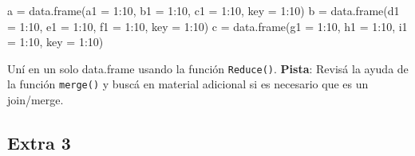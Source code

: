 \documentclass[
]{article}
\newenvironment{Shaded}{\begin{snugshade}}{\end{snugshade}}
\newcommand{\AttributeTok}[1]{\textcolor[rgb]{0.77,0.63,0.00}{#1}}
\newcommand{\DecValTok}[1]{\textcolor[rgb]{0.00,0.00,0.81}{#1}}
\newcommand{\FunctionTok}[1]{\textcolor[rgb]{0.00,0.00,0.00}{#1}}
\newcommand{\NormalTok}[1]{#1}
\newcommand{\OtherTok}[1]{\textcolor[rgb]{0.56,0.35,0.01}{#1}}
\newcommand{\SpecialCharTok}[1]{\textcolor[rgb]{0.00,0.00,0.00}{#1}}
\begin{document}
\begin{Shaded}
\begin{Highlighting}[]
\NormalTok{a }\OtherTok{=} \FunctionTok{data.frame}\NormalTok{(}\AttributeTok{a1 =} \DecValTok{1}\SpecialCharTok{:}\DecValTok{10}\NormalTok{, }
               \AttributeTok{b1 =} \DecValTok{1}\SpecialCharTok{:}\DecValTok{10}\NormalTok{,}
               \AttributeTok{c1 =} \DecValTok{1}\SpecialCharTok{:}\DecValTok{10}\NormalTok{,}
               \AttributeTok{key =} \DecValTok{1}\SpecialCharTok{:}\DecValTok{10}\NormalTok{)}
\NormalTok{b }\OtherTok{=} \FunctionTok{data.frame}\NormalTok{(}\AttributeTok{d1 =} \DecValTok{1}\SpecialCharTok{:}\DecValTok{10}\NormalTok{, }
               \AttributeTok{e1 =} \DecValTok{1}\SpecialCharTok{:}\DecValTok{10}\NormalTok{,}
               \AttributeTok{f1 =} \DecValTok{1}\SpecialCharTok{:}\DecValTok{10}\NormalTok{, }
               \AttributeTok{key =} \DecValTok{1}\SpecialCharTok{:}\DecValTok{10}\NormalTok{)}
\NormalTok{c }\OtherTok{=} \FunctionTok{data.frame}\NormalTok{(}\AttributeTok{g1 =} \DecValTok{1}\SpecialCharTok{:}\DecValTok{10}\NormalTok{, }
               \AttributeTok{h1 =} \DecValTok{1}\SpecialCharTok{:}\DecValTok{10}\NormalTok{,}
               \AttributeTok{i1 =} \DecValTok{1}\SpecialCharTok{:}\DecValTok{10}\NormalTok{,}
               \AttributeTok{key =} \DecValTok{1}\SpecialCharTok{:}\DecValTok{10}\NormalTok{)}
\end{Highlighting}
\end{Shaded}

Uní en un solo data.frame usando la función \texttt{Reduce()}.
\textbf{Pista}: Revisá la ayuda de la función \texttt{merge()} y buscá
en material adicional si es necesario que es un join/merge.

\begin{Shaded}
\end{Shaded}

\hypertarget{extra-3}{%
\subsection{Extra 3}\label{extra-3}}
\end{document}
